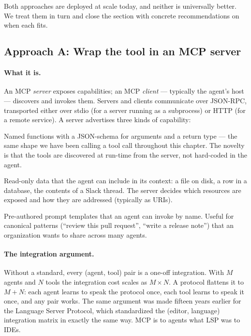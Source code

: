 Both approaches are deployed at scale today, and neither is
universally better. We treat them in turn and close the section
with concrete recommendations on when each fits.

\subsection{Approach A: Wrap the tool in an MCP server}
\label{sec:mcp-approach}

\paragraph{What it is.}
An MCP \emph{server} exposes capabilities; an MCP \emph{client} ---
typically the agent's host --- discovers and invokes them. Servers
and clients communicate over JSON-RPC, transported either over
stdio (for a server running as a subprocess) or HTTP (for a remote
service). A server advertises three kinds of capability:

\begin{description}[style=nextline,leftmargin=1.5em]
\item[Tools.] Named functions with a JSON-schema for arguments and
  a return type --- the same shape we have been calling a tool call
  throughout this chapter. The novelty is that the tools are
  discovered at run-time from the server, not hard-coded in the
  agent.
\item[Resources.] Read-only data that the agent can include in its
  context: a file on disk, a row in a database, the contents of a
  Slack thread. The server decides which resources are exposed and
  how they are addressed (typically as URIs).
\item[Prompts.] Pre-authored prompt templates that an agent can
  invoke by name. Useful for canonical patterns (``review this pull
  request'', ``write a release note'') that an organization wants
  to share across many agents.
\end{description}

\paragraph{The integration argument.}
Without a standard, every (agent, tool) pair is a one-off
integration. With $M$ agents and $N$ tools the integration cost
scales as $M \times N$. A protocol flattens it to $M + N$: each
agent learns to speak the protocol once, each tool learns to speak
it once, and any pair works. The same argument was made fifteen
years earlier for the Language Server Protocol, which standardized
the (editor, language) integration matrix in exactly the same way.
MCP is to agents what LSP was to IDEs.

